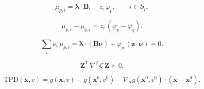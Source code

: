 \documentclass[11pt]{article}
\begin{document}
\begin{equation}
\mu_{p,i}=\boldsymbol\lambda\cdot\mathbf{B}_{i}+z_i\,\varphi_p,\qquad i\in S_p.
\label{eq:chemical_potential_stationarity}
\end{equation}

\begin{equation}
\mu_{p,i}-\mu_{q,i}=z_i\,(\varphi_p-\varphi_q).
\label{eq:interphase_potential_equality}
\end{equation}

\begin{equation}
\sum_i\nu_i\,\mu_{p,i}=\boldsymbol\lambda\cdot(\mathbf{B}\boldsymbol\nu)+\varphi_p\,(\boldsymbol z\cdot\boldsymbol\nu)=0.
\label{eq:reaction_affinity}
\end{equation}

\begin{equation}
\mathbf{Z}^{\mathsf T}\,\nabla^{2}\mathcal{L}\,\mathbf{Z}\succ 0.
\label{eq:reduced_hessian_stability}
\end{equation}

\begin{equation}
\mathrm{TPD}(\boldsymbol x,v)=g(\boldsymbol x,v)-g(\boldsymbol x^{0},v^{0})-\nabla_{\boldsymbol x}g(\boldsymbol x^{0},v^{0})\cdot(\boldsymbol x-\boldsymbol x^{0}).
\label{eq:tangent_plane_distance}
\end{equation}
\end{document}
